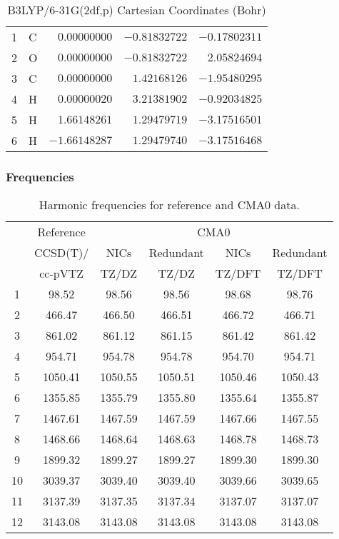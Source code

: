 \documentclass[10pt,oneside]{article}
\begin{document}
\begin{table}[h]
\centering
\caption{B3LYP/6-31G(2df,p) Cartesian Coordinates (Bohr)}
\begin{tabular}{llrrr}
\toprule
1  & C  & $ 0.00000000$ & $-0.81832722$ & $-0.17802311$ \\
2  & O  & $ 0.00000000$ & $-0.81832722$ & $ 2.05824694$ \\
3  & C  & $ 0.00000000$ & $ 1.42168126$ & $-1.95480295$ \\
4  & H  & $ 0.00000020$ & $ 3.21381902$ & $-0.92034825$ \\
5  & H  & $ 1.66148261$ & $ 1.29479719$ & $-3.17516501$ \\
6  & H  & $-1.66148287$ & $ 1.29479740$ & $-3.17516468$ \\
\bottomrule
\end{tabular}
\end{table}

\begin{table}[h!]
\subsubsection*{Frequencies}
\centering
\caption{Harmonic frequencies for reference and CMA0 data.}
\begin{tabular}{cccccc}
\toprule
{} & Reference & \multicolumn{4}{c}{CMA0} \\
{} &  CCSD(T)/ &    NICs &  Redundant &    NICs & Redundant \\
{} &   cc-pVTZ &   TZ/DZ &      TZ/DZ &  TZ/DFT &    TZ/DFT \\
\midrule
1  &     98.52 &   98.56 &      98.56 &   98.68 &     98.76 \\
2  &    466.47 &  466.50 &     466.51 &  466.72 &    466.71 \\
3  &    861.02 &  861.12 &     861.15 &  861.42 &    861.42 \\
4  &    954.71 &  954.78 &     954.78 &  954.70 &    954.71 \\
5  &   1050.41 & 1050.55 &    1050.51 & 1050.46 &   1050.43 \\
6  &   1355.85 & 1355.79 &    1355.80 & 1355.64 &   1355.87 \\
7  &   1467.61 & 1467.59 &    1467.59 & 1467.66 &   1467.55 \\
8  &   1468.66 & 1468.64 &    1468.63 & 1468.78 &   1468.73 \\
9  &   1899.32 & 1899.27 &    1899.27 & 1899.30 &   1899.30 \\
10 &   3039.37 & 3039.40 &    3039.40 & 3039.66 &   3039.65 \\
11 &   3137.39 & 3137.35 &    3137.34 & 3137.07 &   3137.07 \\
12 &   3143.08 & 3143.08 &    3143.08 & 3143.08 &   3143.08 \\
\bottomrule
\end{tabular}
\end{table}
\end{document}
